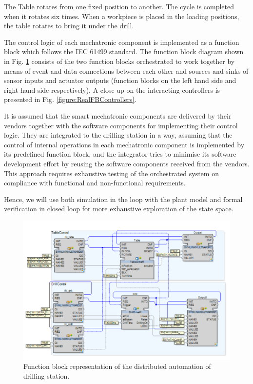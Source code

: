 \documentclass[conference]{IEEEtran}
\begin{document}
The Table rotates from one fixed position to another. The cycle is completed when it rotates six times. 
When a workpiece is placed in the loading positions, the table rotates to bring it under the drill.

The control logic of each mechatronic component is implemented as a function block which follows the IEC 61499 standard. The function block diagram  shown in Fig. \ref{figure:RealFBDiagram} consists of the two function blocks orchestrated to work together by means of event and data connections between each other and sources and sinks of sensor inputs and actuator outputs (function blocks on the left hand side and right hand side respectively). A close-up on the interacting controllers is presented in Fig. \ref{figure:RealFBControllers}.

It is assumed that the smart mechatronic components are delivered by their vendors together with the software components for implementing their control logic. They are integrated to the drilling station in a way, assuming that the control of internal operations in each mechatronic component is implemented by its predefined function block, and the integrator tries to minimise its software development effort by reusing the software components received from the vendors.
This approach requires exhaustive testing of the orchestrated system on compliance with functional and non-functional requirements. 

Hence, we will use both simulation in the loop with the plant model and formal verification in closed loop for more exhaustive exploration of the state space. 



\begin{figure}
    \centering
    \includegraphics[scale = 0.4]{images/fig2updated.PNG}
    \caption{Function block representation of the distributed automation of drilling station.}
    \label{figure:RealFBDiagram}
\end{figure}
\end{document}
